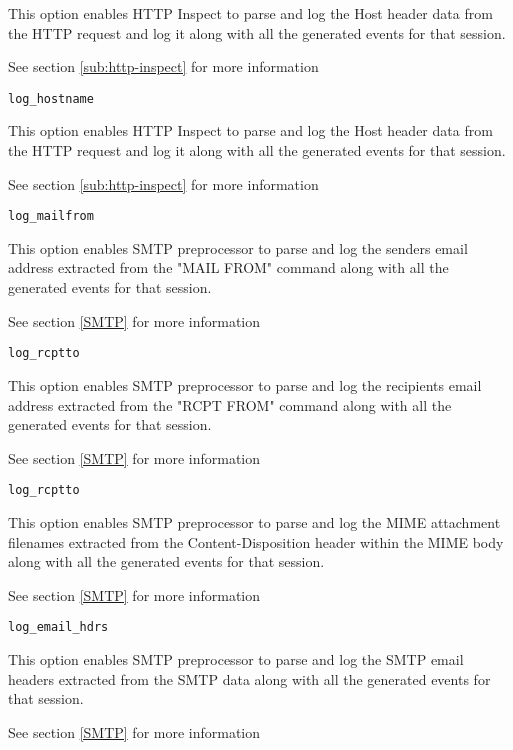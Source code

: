 \documentclass[english]{report}
\begin{document}
This option enables HTTP Inspect to parse and log the Host header
data from the HTTP request and log it along with all the generated
events for that session.

See section \ref{sub:http-inspect} for more information

\begin{verbatim}
log_hostname 
\end{verbatim}

This option enables HTTP Inspect to parse and log the Host header
data from the HTTP request and log it along with all the generated
events for that session.

See section \ref{sub:http-inspect} for more information

\begin{verbatim}
log_mailfrom
\end{verbatim}

This option enables SMTP preprocessor to parse and log the senders
email address extracted from the "MAIL FROM" command along with
all the generated events for that session.

See section \ref{SMTP} for more information

\begin{verbatim}
log_rcptto
\end{verbatim}

This option enables SMTP preprocessor to parse and log the
recipients email address extracted from the "RCPT FROM" command
along with all the generated events for that session.

See section \ref{SMTP} for more information

\begin{verbatim}
log_rcptto
\end{verbatim}

This option enables SMTP preprocessor to parse and log the MIME
attachment filenames extracted from the Content-Disposition header
within the MIME body along with all the generated events for that
session.

See section \ref{SMTP} for more information

\begin{verbatim}
log_email_hdrs
\end{verbatim}

This option enables SMTP preprocessor to parse and log the SMTP
email headers extracted from the SMTP data along with all the
generated events for that session.

See section \ref{SMTP} for more information
\end{document}
